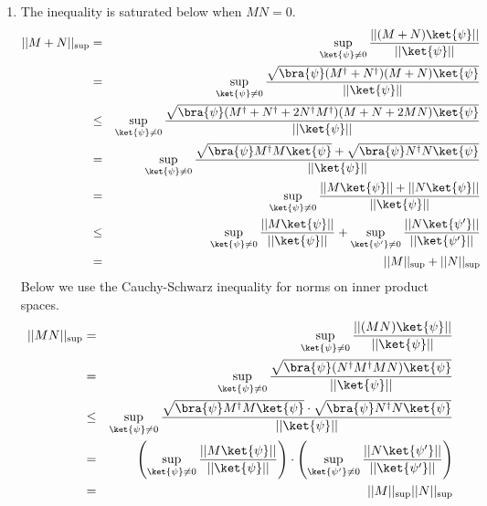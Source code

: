 \documentclass[12pt]{article}
\begin{document}
\begin{enumerate}
\item %
The inequality is saturated below when $MN = 0$.
%
\begin{eqnarray*}
\displaystyle ||M+N||_{\textrm{sup}}
& = & \sup_{\ket{\psi}\ne 0} \frac{||(M+N)\ket{\psi}||}{||\ket{\psi}||}\\
& = & \sup_{\ket{\psi}\ne 0} \frac{\sqrt{\bra{\psi}(M^\dagger+N^\dagger)(M+N)\ket{\psi}}}{||\ket{\psi}||}\\
& \le & \sup_{\ket{\psi}\ne 0} \frac{\sqrt{\bra{\psi}(M^\dagger+N^\dagger+2N^\dagger M^\dagger)(M+N+2MN)\ket{\psi}}}{||\ket{\psi}||}\\
& = & \sup_{\ket{\psi}\ne 0} \frac{\sqrt{\bra{\psi}M^\dagger M\ket{\psi}} + \sqrt{\bra{\psi}N^\dagger N\ket{\psi}}}{||\ket{\psi}||}\\
& = & \sup_{\ket{\psi}\ne 0} \frac{||M\ket{\psi}||+||N\ket{\psi}||}{||\ket{\psi}||}\\
& \le & \sup_{\ket{\psi}\ne 0} \frac{||M\ket{\psi}||}{||\ket{\psi}||} +
    \sup_{\ket{\psi'}\ne 0} \frac{||N\ket{\psi'}||}{||\ket{\psi'}||}\\
& = & ||M||_{\textrm{sup}} + ||N||_{\textrm{sup}}
\end{eqnarray*}
%
Below we use the Cauchy-Schwarz inequality for norms on
inner product spaces.
%
\begin{eqnarray*}
\displaystyle ||MN||_{\textrm{sup}}
& = & \sup_{\ket{\psi}\ne 0} \frac{||(MN)\ket{\psi}||}{||\ket{\psi}||}\\
& = & \sup_{\ket{\psi}\ne 0} \frac{\sqrt{\bra{\psi}(N^\dagger M^\dagger MN)\ket{\psi}}}{||\ket{\psi}||}\\
& \le & \sup_{\ket{\psi}\ne 0} \frac{\sqrt{\bra{\psi}M^\dagger M\ket{\psi}}\cdot\sqrt{\bra{\psi}N^\dagger N\ket{\psi}}}{||\ket{\psi}||}\\
& = & \left(\sup_{\ket{\psi}\ne 0} \frac{||M\ket{\psi}||}{||\ket{\psi}||}\right)\cdot
      \left(\sup_{\ket{\psi'}\ne 0} \frac{||N\ket{\psi'}||}{||\ket{\psi'}||}\right)\\
& = & ||M||_{\textrm{sup}}||N||_{\textrm{sup}}
\end{eqnarray*}


\end{enumerate}
\end{document}
